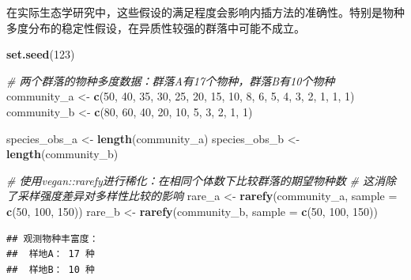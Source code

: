 \documentclass[
  twoside,12pt,fontset=none]{ctexbook}
\newenvironment{Shaded}{\begin{snugshade}}{\end{snugshade}}
\newcommand{\AttributeTok}[1]{\textcolor[rgb]{0.13,0.29,0.53}{#1}}
\newcommand{\CommentTok}[1]{\textcolor[rgb]{0.56,0.35,0.01}{\textit{#1}}}
\newcommand{\DecValTok}[1]{\textcolor[rgb]{0.00,0.00,0.81}{#1}}
\newcommand{\FunctionTok}[1]{\textcolor[rgb]{0.13,0.29,0.53}{\textbf{#1}}}
\newcommand{\NormalTok}[1]{#1}
\newcommand{\OtherTok}[1]{\textcolor[rgb]{0.56,0.35,0.01}{#1}}
\begin{document}
在实际生态学研究中，这些假设的满足程度会影响内插方法的准确性。特别是物种多度分布的稳定性假设，在异质性较强的群落中可能不成立。

\begin{Shaded}
\begin{Highlighting}[]
\FunctionTok{set.seed}\NormalTok{(}\DecValTok{123}\NormalTok{)}

\CommentTok{\# 两个群落的物种多度数据：群落A有17个物种，群落B有10个物种}
\NormalTok{community\_a }\OtherTok{\textless{}{-}} \FunctionTok{c}\NormalTok{(}\DecValTok{50}\NormalTok{, }\DecValTok{40}\NormalTok{, }\DecValTok{35}\NormalTok{, }\DecValTok{30}\NormalTok{, }\DecValTok{25}\NormalTok{, }\DecValTok{20}\NormalTok{, }\DecValTok{15}\NormalTok{, }\DecValTok{10}\NormalTok{, }\DecValTok{8}\NormalTok{, }\DecValTok{6}\NormalTok{, }\DecValTok{5}\NormalTok{, }\DecValTok{4}\NormalTok{, }\DecValTok{3}\NormalTok{, }\DecValTok{2}\NormalTok{, }\DecValTok{1}\NormalTok{, }\DecValTok{1}\NormalTok{, }\DecValTok{1}\NormalTok{)}
\NormalTok{community\_b }\OtherTok{\textless{}{-}} \FunctionTok{c}\NormalTok{(}\DecValTok{80}\NormalTok{, }\DecValTok{60}\NormalTok{, }\DecValTok{40}\NormalTok{, }\DecValTok{20}\NormalTok{, }\DecValTok{10}\NormalTok{, }\DecValTok{5}\NormalTok{, }\DecValTok{3}\NormalTok{, }\DecValTok{2}\NormalTok{, }\DecValTok{1}\NormalTok{, }\DecValTok{1}\NormalTok{)}

\NormalTok{species\_obs\_a }\OtherTok{\textless{}{-}} \FunctionTok{length}\NormalTok{(community\_a)}
\NormalTok{species\_obs\_b }\OtherTok{\textless{}{-}} \FunctionTok{length}\NormalTok{(community\_b)}

\CommentTok{\# 使用vegan::rarefy进行稀化：在相同个体数下比较群落的期望物种数}
\CommentTok{\# 这消除了采样强度差异对多样性比较的影响}
\NormalTok{rare\_a }\OtherTok{\textless{}{-}} \FunctionTok{rarefy}\NormalTok{(community\_a, }\AttributeTok{sample =} \FunctionTok{c}\NormalTok{(}\DecValTok{50}\NormalTok{, }\DecValTok{100}\NormalTok{, }\DecValTok{150}\NormalTok{))}
\NormalTok{rare\_b }\OtherTok{\textless{}{-}} \FunctionTok{rarefy}\NormalTok{(community\_b, }\AttributeTok{sample =} \FunctionTok{c}\NormalTok{(}\DecValTok{50}\NormalTok{, }\DecValTok{100}\NormalTok{, }\DecValTok{150}\NormalTok{))}
\end{Highlighting}
\end{Shaded}

\begin{verbatim}
## 观测物种丰富度：
##  样地A： 17 种
##  样地B： 10 种
\end{verbatim}
\end{document}
